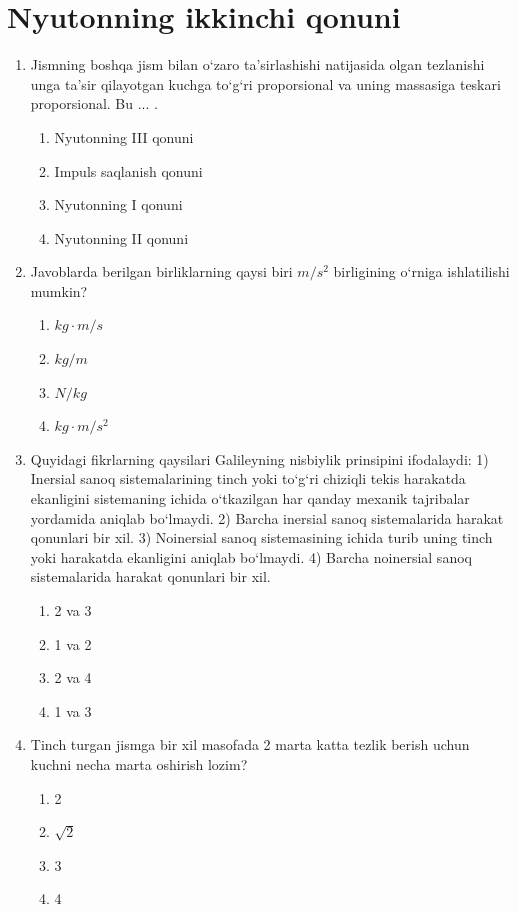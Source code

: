 \section{Nyutonning ikkinchi qonuni}

\begin{enumerate}

\item Jismning boshqa jism bilan o‘zaro ta’sirlashishi natijasida olgan tezlanishi unga ta’sir qilayotgan kuchga to‘g‘ri proporsional va uning massasiga teskari proporsional. Bu ... .
\begin{enumerate}[label=\Alph*)]
\item Nyutonning III qonuni
\item Impuls saqlanish qonuni
\item Nyutonning I qonuni
\item Nyutonning II qonuni
\end{enumerate}

\item Javoblarda berilgan birliklarning qaysi biri $m/s^2$ birligining o‘rniga ishlatilishi mumkin?
\begin{enumerate}[label=\Alph*)]
\item $kg \cdot m/s$
\item $kg/m$
\item $N/kg$
\item $kg \cdot m/s^2$

\end{enumerate}

\item Quyidagi fikrlarning qaysilari Galileyning nisbiylik prinsipini ifodalaydi:
1) Inersial sanoq sistemalarining tinch yoki to‘g‘ri chiziqli tekis harakatda ekanligini sistemaning ichida o‘tkazilgan har qanday mexanik tajribalar yordamida aniqlab bo‘lmaydi.
2) Barcha inersial sanoq sistemalarida harakat qonunlari bir xil.
3) Noinersial sanoq sistemasining ichida turib uning tinch yoki harakatda ekanligini aniqlab bo‘lmaydi.
4) Barcha noinersial sanoq sistemalarida harakat qonunlari bir xil.
\begin{enumerate}[label=\Alph*)]
\item 2 va 3
\item 1 va 2
\item 2 va 4
\item 1 va 3

\end{enumerate}

\item Tinch turgan jismga bir xil masofada 2 marta katta tezlik berish uchun kuchni necha marta oshirish lozim?
\begin{enumerate}[label=\Alph*)]
\item 2
\item $\sqrt{2}$
\item 3
\item 4
\end{enumerate}


\end{enumerate}
